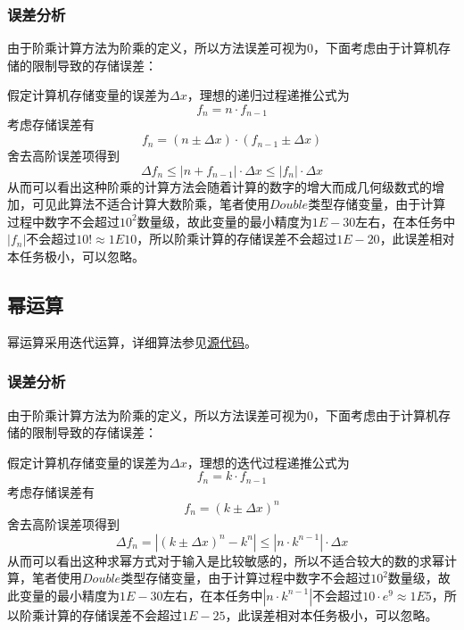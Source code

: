\documentclass[lang=cn,11pt,a4paper]{elegantpaper}
\begin{document}
\subsubsection{误差分析}
由于阶乘计算方法为阶乘的定义，所以方法误差可视为0，下面考虑由于计算机存储的限制导致的存储误差：

假定计算机存储变量的误差为$\Delta x$，理想的递归过程递推公式为
\begin{equation}
  f_{n}=n\cdot f_{n-1} 
\end{equation}
考虑存储误差有
\begin{equation}
  f_{n}=(n\pm \Delta x)\cdot(f_{n-1}\pm \Delta x)
\end{equation}
舍去高阶误差项得到
\begin{equation}
  \Delta f_n \leq |n+f_{n-1}|\cdot \Delta x \leq |f_n|\cdot \Delta x
\end{equation}
从而可以看出这种阶乘的计算方法会随着计算的数字的增大而成几何级数式的增加，可见此算法不适合计算大数阶乘，笔者使用$Double$类型存储变量，由于计算过程中数字不会超过$10^2$数量级，故此变量的最小精度为$1E-30$左右，在本任务中$|f_n|$不会超过$10! \approx 1E10$，所以阶乘计算的存储误差不会超过$1E-20$，此误差相对本任务极小，可以忽略。
\subsection{幂运算}
幂运算采用迭代运算，详细算法参见\href{https://github.com/Antonio-Chan/SineCalculate}{源代码}。
\subsubsection{误差分析}
由于阶乘计算方法为阶乘的定义，所以方法误差可视为0，下面考虑由于计算机存储的限制导致的存储误差：

假定计算机存储变量的误差为$\Delta x$，理想的迭代过程递推公式为
\begin{equation}
  f_{n}=k\cdot f_{n-1} 
\end{equation}
考虑存储误差有
\begin{equation}
  f_{n}=(k\pm \Delta x)^{n}
\end{equation}
舍去高阶误差项得到
\begin{equation}
  \Delta f_n = |(k\pm \Delta x)^{n}-k^n| \leq |n\cdot k^{n-1}|\cdot \Delta x
\end{equation}
从而可以看出这种求幂方式对于输入是比较敏感的，所以不适合较大的数的求幂计算，笔者使用$Double$类型存储变量，由于计算过程中数字不会超过$10^2$数量级，故此变量的最小精度为$1E-30$左右，在本任务中$|n\cdot k^{n-1}|$不会超过$10\cdot e^9 \approx 1E5$，所以阶乘计算的存储误差不会超过$1E-25$，此误差相对本任务极小，可以忽略。
\end{document}
